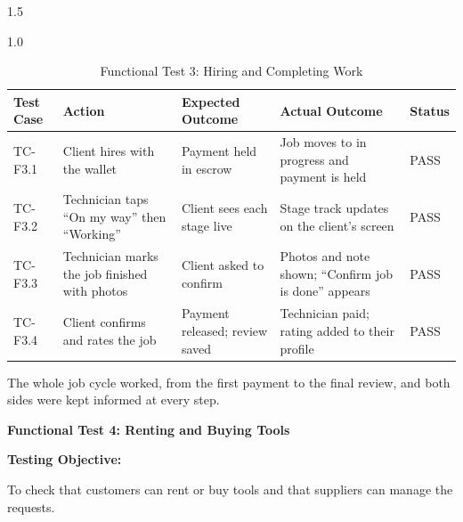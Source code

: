 \documentclass[A4paper,12pt]{report}
\theoremstyle{plain}
\theoremstyle{definition}
\theoremstyle{remark}
\numberwithin{equation}{section}
\begin{document}
\begin{spacing}{1.5}
\begin{table}[H]
\centering
\caption{Functional Test 3: Hiring and Completing Work}
\begin{spacing}{1.0}
{\small
\begin{tabular}{|p{}|p{}|p{}|p{}|p{}|}
\hline
\textbf{Test Case} & \textbf{Action} & \textbf{Expected Outcome} & \textbf{Actual Outcome} & \textbf{Status} \\ \hline
TC-F3.1 & Client hires with the wallet & Payment held in escrow & Job moves to in progress and payment is held & PASS \\ \hline
TC-F3.2 & Technician taps ``On my way'' then ``Working'' & Client sees each stage live & Stage track updates on the client's screen & PASS \\ \hline
TC-F3.3 & Technician marks the job finished with photos & Client asked to confirm & Photos and note shown; ``Confirm job is done'' appears & PASS \\ \hline
TC-F3.4 & Client confirms and rates the job & Payment released; review saved & Technician paid; rating added to their profile & PASS \\ \hline
\end{tabular}}
\end{spacing}
\end{table}

The whole job cycle worked, from the first payment to the final review, and both sides were kept informed at every step.

\textbf{Functional Test 4: Renting and Buying Tools}

\textbf{Testing Objective:}

To check that customers can rent or buy tools and that suppliers can manage the requests.


\end{spacing}
\end{document}
